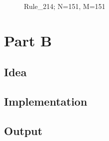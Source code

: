 \documentclass[12pt,a4paper]{article}
\begin{document}
\begin{figure}[H]
    \centering
    \caption{Rule\_214; N=151, M=151}
    \label{fig:your_label}
\end{figure}

\newpage





\section{Part B}


\vspace{1cm}

\subsection{Idea}


\vspace{1cm}

\subsection{Implementation}


\vspace{1cm}

\subsection{Output}


\vspace{1cm}



\newpage


\end{document}
